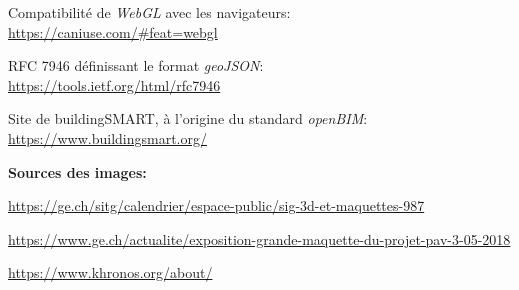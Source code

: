 \begin{thebibliography}{9}
 Compatibilité de \textit{WebGL} avec les navigateurs: \\
\url{https://caniuse.com/\#feat=webgl}

 RFC 7946 définissant le format \textit{geoJSON}: \\
\url{https://tools.ietf.org/html/rfc7946}

 Site de buildingSMART, à l'origine du standard \textit{openBIM}: \\
\url{https://www.buildingsmart.org/}

\vspace*{.06\textheight}
\textbf{Sources des images:}

 \url{https://ge.ch/sitg/calendrier/espace-public/sig-3d-et-maquettes-987}

 \url{https://www.ge.ch/actualite/exposition-grande-maquette-du-projet-pav-3-05-2018}

 \url{https://www.khronos.org/about/}


\end{thebibliography}
